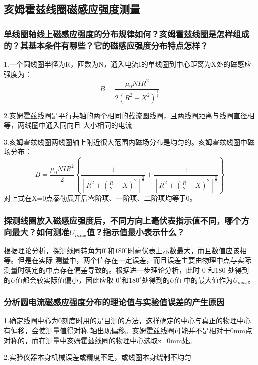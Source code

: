 \documentclass[12pt,a4paper]{article}
\begin{document}
    \subsection{亥姆霍兹线圈磁感应强度测量}
        \subsubsection{单线圈轴线上磁感应强度的分布规律如何？亥姆霍兹线圈是怎样组成的？其基本条件有哪些？它的磁感应强度分布特点怎样？}
        1.一个圆线圈半径为R，匝数为N，通入电流I的单线圈到中心距离为X处的磁感应强度为：
        \[B = \frac{{{\mu _0}NI{R^2}}}{{2{{({R^2} + {X^2})}^{\frac{3}{2}}}}}\]

        2.亥姆霍兹线圈是平行共轴的两个相同的载流圆线圈，且两线圈距离与线圈直径相等，两线圈中通入同向且
        大小相同的电流

        3.亥姆霍兹线圈两线圈轴上附近很大范围内磁场分布是均匀的。亥姆霍兹线圈中磁场分布：
        \[B = \frac{{{\mu _0}NI{R^2}}}{2}\left\{ {\frac{1}{{{{\left[ {{R^2} + {{\left( {\frac{R}{2} + X} \right)}^2}} \right]}^{\frac{3}{2}}}}} + \frac{1}{{{{\left[ {{R^2} + {{\left( {\frac{R}{2} - X} \right)}^2}} \right]}^{\frac{3}{2}}}}}} \right\}\]
        对上式在X=0点泰勒展开后零阶项、一阶项、二阶项均等于0。

        \subsubsection{探测线圈放入磁感应强度后，不同方向上毫伏表指示值不同，哪个方向最大？如何测准$U_{max}$值？指示值最小表示什么？}
        根据理论分析，探测线圈转角为$0^{\circ}$和$180^{\circ}$时毫伏表上示数最大，而且数值应该相等。但是在实际
        测量中，两个值存在一定误差，而且误差主要由物理中点与实际测量时确定的中点存在偏差导致的。根据进一步理论分析，此时
        $0^{\circ}$和$180^{\circ}$处得到的$U$值都会较实际值偏小，因此应取 $0^{\circ}$和$180^{\circ}$处得到的$U$值
        中的最大值作为$U_{max}$。

        \subsubsection{分析圆电流磁感应强度分布的理论值与实验值误差的产生原因}
        1.确定线圈中心为0刻度时用的是目测的方法，这样确定的中心与真正的物理中心有偏移，会使测量值得对称
        轴出现偏移。亥姆霍兹线圈可能并不是相对于0mm点对称的，而在测量中亥姆霍兹线圈的物理中心选取x=0mm处。

        2.实验仪器本身机械误差或精度不足，或线圈本身绕制不均匀
        
\end{document}
